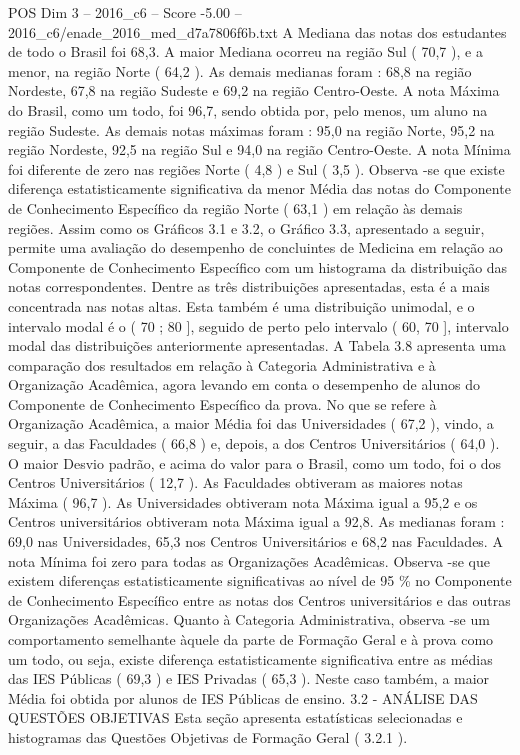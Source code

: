 \begin{textsample}{POS Dim 3 – 2016\_c6 – Score -5.00 – 2016\_c6/enade\_2016\_med\_d7a7806f6b.txt}
A Mediana das notas dos estudantes de todo o Brasil foi 68,3.
A maior Mediana ocorreu na região Sul ( 70,7 ), e a menor, na região Norte ( 64,2 ).
As demais medianas foram : 68,8 na região Nordeste, 67,8 na região Sudeste e 69,2 na região Centro-Oeste.
A nota Máxima do Brasil, como um todo, foi 96,7, sendo obtida por, pelo menos, um aluno na região Sudeste.
As demais notas máximas foram : 95,0 na região Norte, 95,2 na região Nordeste, 92,5 na região Sul e 94,0 na região Centro-Oeste.
A nota Mínima foi diferente de zero nas regiões Norte ( 4,8 ) e Sul ( 3,5 ).
Observa -se que existe diferença estatisticamente significativa da menor Média das notas do Componente de Conhecimento Específico da região Norte ( 63,1 ) em relação às demais regiões.
Assim como os Gráficos 3.1 e 3.2, o Gráfico 3.3, apresentado a seguir, permite uma avaliação do desempenho de concluintes de Medicina em relação ao Componente de Conhecimento Específico com um histograma da distribuição das notas correspondentes.
Dentre as três distribuições apresentadas, esta é a mais concentrada nas notas altas.
Esta também é uma distribuição unimodal, e o intervalo modal é o ( 70 ; 80 ], seguido de perto pelo intervalo ( 60, 70 ], intervalo modal das distribuições anteriormente apresentadas.
A Tabela 3.8 apresenta uma comparação dos resultados em relação à Categoria Administrativa e à Organização Acadêmica, agora levando em conta o desempenho de alunos do Componente de Conhecimento Específico da prova.
No que se refere à Organização Acadêmica, a maior Média foi das Universidades ( 67,2 ), vindo, a seguir, a das Faculdades ( 66,8 ) e, depois, a dos Centros Universitários ( 64,0 ).
O maior Desvio padrão, e acima do valor para o Brasil, como um todo, foi o dos Centros Universitários ( 12,7 ).
As Faculdades obtiveram as maiores notas Máxima ( 96,7 ).
As Universidades obtiveram nota Máxima igual a 95,2 e os Centros universitários obtiveram nota Máxima igual a 92,8.
As medianas foram : 69,0 nas Universidades, 65,3 nos Centros Universitários e 68,2 nas Faculdades.
A nota Mínima foi zero para todas as Organizações Acadêmicas.
Observa -se que existem diferenças estatisticamente significativas ao nível de 95 \% no Componente de Conhecimento Específico entre as notas dos Centros universitários e das outras Organizações Acadêmicas.
Quanto à Categoria Administrativa, observa -se um comportamento semelhante àquele da parte de Formação Geral e à prova como um todo, ou seja, existe diferença estatisticamente significativa entre as médias das IES Públicas ( 69,3 ) e IES Privadas ( 65,3 ).
Neste caso também, a maior Média foi obtida por alunos de IES Públicas de ensino. 3.2 - ANÁLISE DAS QUESTÕES OBJETIVAS Esta seção apresenta estatísticas selecionadas e histogramas das Questões Objetivas de Formação Geral ( 3.2.1 ).

\end{textsample}
